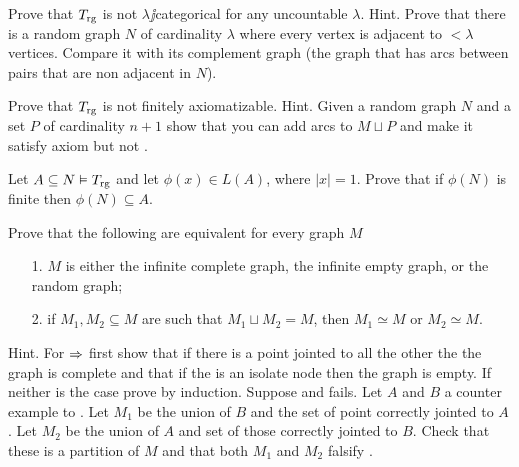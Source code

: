 \documentclass[creche.tex]{subfiles}
\begin{document}
% 

\begin{exercise}
Prove that $T_{\rm rg}$ is not $\lambda\jj$categorical for any uncountable $\lambda$. Hint. Prove that there is a random graph $N$ of cardinality $\lambda$ where every vertex is adjacent to $<\lambda$ vertices. Compare it with its complement graph (the graph that has arcs between pairs that are non adjacent in $N$).\QED
\end{exercise}

\begin{exercise}
Prove that $T_{\rm rg}$ is not finitely axiomatizable. Hint. Given a random graph $N$ and a set $P$ of cardinality $n+1$ show that you can add arcs to $M\sqcup P$ and make it satisfy axiom  but not .\QED
\end{exercise}


\begin{exercise}
Let $A\subseteq N\models T_{\rm rg}$ and let $\phi(x)\in L(A)$, where $|x|=1$. Prove that if $\phi(N)$ is finite then $\phi(N)\subseteq A$.\QED
\end{exercise}


\begin{exercise}
Prove that the following are equivalent for every graph $M$ 
\begin{itemize}
\item[1.] $M$ is either the infinite complete graph, the infinite empty graph, or the random graph;
\item[2.] if $M_1,M_2\subseteq M$ are such that $M_1\sqcup M_2=M$, then $M_1\simeq M$ or $M_2\simeq M$.
\end{itemize}
Hint. For $\IMP$ first show that if there is a point jointed to all the other the the graph is complete and that if the is an isolate node then the graph is empty. If neither is the case prove  by induction. Suppose  and  fails. Let $A$ and $B$ a counter example to . Let $M_1$ be the union of $B$ and the set of point correctly jointed to $A$. Let $M_2$ be the union of $A$ and set of those correctly jointed to $B$. Check that these is a partition of $M$ and that both $M_1$ and $M_2$ falsify .\QED
\end{exercise}
\end{document}
